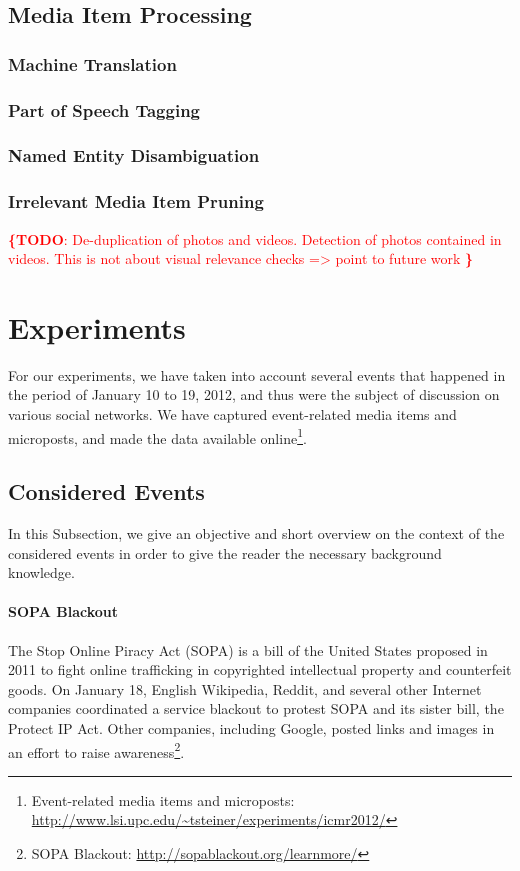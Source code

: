 \documentclass{acm_proc_article-sp}
\newcommand{\todo}[1]{\noindent\textcolor{red}{{\bf \{TODO}: #1{\bf \}}}}
\newcommand{\inlinelistingsize}{\fontsize{8pt}{11pt}}
\let\oldurl\url
\renewcommand{\url}[1]{\inlinelistingsize\oldurl{#1}}
\begin{document}
\subsection{Media Item Processing}

\subsubsection{Machine Translation}

\subsubsection{Part of Speech Tagging}

\subsubsection{Named Entity Disambiguation}

\subsubsection{Irrelevant Media Item Pruning}
\todo{
De-duplication of photos and videos.
Detection of photos contained in videos.
This is not about visual relevance checks => point to future work
}

\section{Experiments}
\label{sec:experiments}
For our experiments, we have taken into account several events that happened in the period of January 10 to 19, 2012, and thus were the subject of discussion on various social networks.
We have captured event-related media items and microposts, and made the data available online\footnote{Event-related media items and microposts: \url{http://www.lsi.upc.edu/~tsteiner/experiments/icmr2012/}}. 

\subsection{Considered Events}
In this Subsection, we give an objective and short overview on the context of the considered events in order to give the reader the necessary background knowledge.

\paragraph{SOPA Blackout}
The Stop Online Piracy Act (SOPA) is a bill of the United States proposed in 2011 to fight online trafficking in copyrighted intellectual property and counterfeit goods.
On January 18, English Wikipedia, Reddit, and several other Internet companies coordinated a service blackout to protest SOPA and its sister bill, the Protect IP Act.
Other companies, including Google, posted links and images in an effort to raise awareness\footnote{SOPA Blackout: \url{http://sopablackout.org/learnmore/}}.
\end{document}
